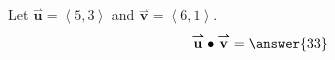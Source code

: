 \documentclass{ximera}
\author{Gregory Hartman \and Matthew Carr}
\begin{document}
\begin{exercise}
Let $\overset{\boldsymbol{\rightharpoonup}}{\mathbf{u}} = \left< 5,3 \right>$ and $\overset{\boldsymbol{\rightharpoonup}}{\mathbf{v}} = \left< 6,1 \right>$.
\[
\overset{\boldsymbol{\rightharpoonup}}{\mathbf{u}} \bullet \overset{\boldsymbol{\rightharpoonup}}{\mathbf{v}} = \answer{33}
\]
\end{exercise}
\end{document}
